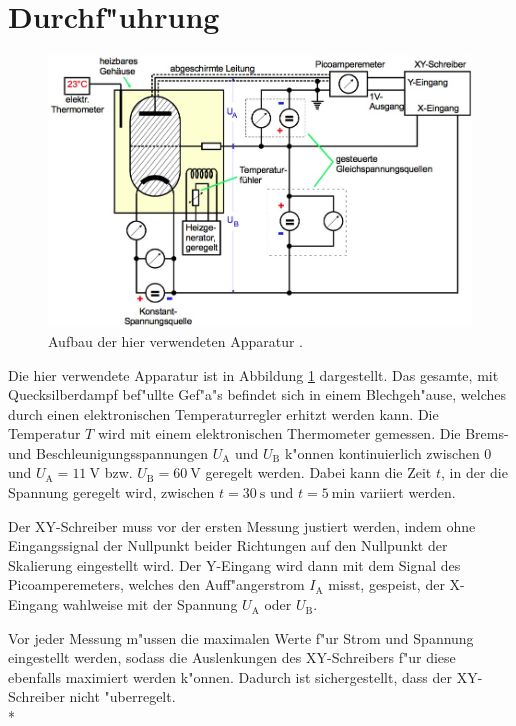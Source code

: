 	\clearpage

\section{Durchf"uhrung}
\label{sec:durchfuehrung}
	\begin{figure}[h]
		\centering
		\includegraphics[width = 12cm]{img/aufbau-exakt.jpeg}
		\caption{Aufbau der hier verwendeten Apparatur \cite{anleitung}. \label{fig:aufbau-exakt}}
	\end{figure}

	Die hier verwendete Apparatur ist in Abbildung \ref{fig:aufbau-exakt} dargestellt.
	Das gesamte, mit Quecksilberdampf bef"ullte Gef"a"s befindet sich in einem Blechgeh"ause, welches durch einen elektronischen Temperaturregler erhitzt werden kann.
	Die Temperatur $T$ wird mit einem elektronischen Thermometer gemessen.
	Die Brems- und Beschleunigungsspannungen $U_\mathrm{A}$ und $U_\mathrm{B}$ k"onnen kontinuierlich zwischen 0 und $U_\mathrm{A} = \SI{11}{\volt}$ bzw. $U_\mathrm{B} = \SI{60}{\volt}$ geregelt werden.
	Dabei kann die Zeit $t$, in der die Spannung geregelt wird, zwischen $t = \SI{30}{\second}$ und $t = \SI{5}{\minute}$ variiert werden.

	Der XY-Schreiber muss vor der ersten Messung justiert werden, indem ohne Eingangssignal der Nullpunkt beider Richtungen auf den Nullpunkt der Skalierung eingestellt wird.
	Der Y-Eingang wird dann mit dem Signal des Picoamperemeters, welches den Auff"angerstrom $I_\mathrm{A}$ misst, gespeist, 
	der X-Eingang wahlweise mit der Spannung $U_\mathrm{A}$ oder $U_\mathrm{B}$.

	Vor jeder Messung m"ussen die maximalen Werte f"ur Strom und Spannung eingestellt werden, sodass die Auslenkungen des XY-Schreibers f"ur diese ebenfalls maximiert werden k"onnen.
	Dadurch ist sichergestellt, dass der XY-Schreiber nicht "uberregelt.
	\\*

